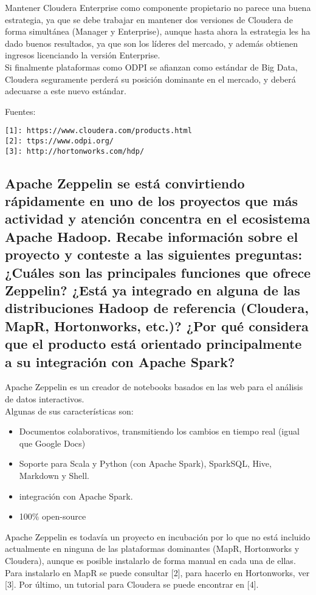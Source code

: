 \documentclass[12pt,a4paper,twoside,openright,titlepage,final]{article}
\begin{document}
Mantener Cloudera Enterprise como componente propietario no parece una buena estrategia, ya que se debe trabajar en mantener dos versiones de Cloudera de forma simultánea (Manager y Enterprise), aunque hasta ahora la estrategia les ha dado buenos resultados, ya que son los líderes del mercado, y además obtienen ingresos licenciando la versión Enterprise.\\

Si finalmente plataformas como ODPI se afianzan como estándar de Big Data, Cloudera seguramente perderá su posición dominante en el mercado, y deberá adecuarse a este nuevo estándar.

Fuentes:\\
\begin{verbatim}
[1]: https://www.cloudera.com/products.html
[2]: ttps://www.odpi.org/
[3]: http://hortonworks.com/hdp/
\end{verbatim}

\subsection{Apache Zeppelin se está convirtiendo rápidamente en uno de los proyectos que más actividad y atención concentra en el ecosistema Apache Hadoop. Recabe información sobre el proyecto y conteste a las siguientes preguntas: ¿Cuáles son las principales funciones que ofrece Zeppelin? ¿Está ya integrado en alguna de las distribuciones Hadoop de referencia (Cloudera, MapR, Hortonworks, etc.)? ¿Por qué considera que el producto está orientado principalmente a su integración con Apache Spark?}

Apache Zeppelin es un creador de notebooks basados en las web para el análisis de datos interactivos.\\

Algunas de sus características son:

\begin{itemize}
\item Documentos colaborativos, transmitiendo los cambios en tiempo real (igual que Google Docs)
\item Soporte para Scala y Python (con Apache Spark), SparkSQL, Hive, Markdown y Shell.
\item integración con Apache Spark.
\item 100\% open-source
\end{itemize}

Apache Zeppelin es todavía un proyecto en incubación por lo que no está incluido actualmente en ninguna de las plataformas dominantes (MapR, Hortonworks y Cloudera), aunque es posible instalarlo de forma manual en cada una de ellas. Para instalarlo en MapR se puede consultar [2], para hacerlo en Hortonworks, ver [3]. Por último, un tutorial para Cloudera se puede encontrar en [4].\\
\end{document}

